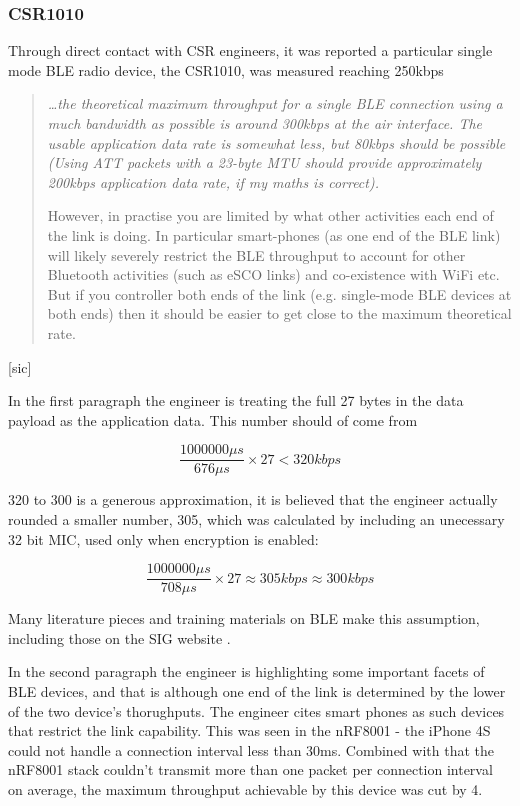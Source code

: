 \documentclass[]{article}
\begin{document}
\clearpage

\subsubsection{CSR1010}
Through direct contact with \ac{CSR} engineers, it was reported a particular single mode \ac{BLE} radio device, the CSR1010, was measured reaching 250kbps

\begin{quote}\itshape \ldots the theoretical maximum throughput for a single BLE 
connection using a much bandwidth as possible is around 300kbps at the 
air interface. The usable application data rate is somewhat less, but 
80kbps should be possible (Using ATT packets with a 23-byte MTU should 
provide approximately 200kbps application data rate, if my maths is 
correct).

However, in practise you are limited by what other activities each end 
of the link is doing. In particular smart-phones (as one end of the BLE 
link) will likely severely restrict the BLE throughput to account for 
other Bluetooth activities (such as eSCO links) and co-existence with 
WiFi etc. But if you controller both ends of the link (e.g. single-mode 
BLE devices at both ends) then it should be easier to get close to the 
maximum theoretical rate.  \text{ \textnormal{[sic]}}
\end{quote}[sic]

 In the first paragraph the engineer is treating the full 27 bytes in the data payload as the application data. This number should of come from

\begin{displaymath}
\frac{1000000 \mu s}{676 \mu s} \times 27 < 320 kbps
\end{displaymath}

320 to 300 is a generous approximation, it is believed that the engineer actually rounded a smaller number, 305, which was calculated by including an unecessary 32 bit \ac{MIC}, used only when encryption is enabled:

\begin{displaymath}
\frac{1000000 \mu s}{708 \mu s} \times 27 \approx 305 kbps \approx 300 kbps
\end{displaymath}

Many literature pieces and training materials on \ac{BLE} make this assumption, including those on the \ac{SIG} website \cite{sig} \cite{sigdebug}. 

In the second paragraph the engineer is highlighting some important facets of \ac{BLE} devices, and that is although one end of the link is determined by the lower of the two device's thorughputs. The engineer cites smart phones as such devices that restrict the link capability. This was seen in the nRF8001 - the iPhone 4S could not handle a connection interval less than 30ms. Combined with that the nRF8001 stack couldn't transmit more than one packet per connection interval on average, the maximum throughput achievable by this device was cut by 4. 
\end{document}
